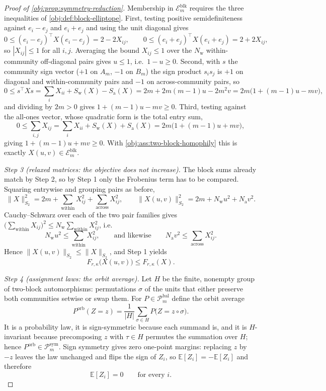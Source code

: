 \documentclass[11pt]{article}
\begin{document}
\begin{proof}[Proof of \cref{obj:prop:symmetry-reduction}]
Membership in \(\mathcal E_m^{\mathrm{blk}}\) requires the three inequalities of \cref{obj:def:block-elliptope}.  First, testing positive semidefiniteness against \(e_i-e_j\) and \(e_i+e_j\) and using the unit diagonal gives
\[
0\le(e_i-e_j)^\top X(e_i-e_j)=2-2X_{ij},
\qquad
0\le(e_i+e_j)^\top X(e_i+e_j)=2+2X_{ij},
\]
so \(|X_{ij}|\le1\) for all \(i,j\). %
Averaging the bound \(X_{ij}\le1\) over the \(N_{\mathrm{w}}\) within-community off-diagonal pairs gives \(u\le1\), i.e.\ \(1-u\ge0\).  Second, with \(s\) the community sign vector (\(+1\) on \(A_m\), \(-1\) on \(B_m\)) the sign product \(s_is_j\) is \(+1\) on diagonal and within-community pairs and \(-1\) on across-community pairs, so
\[
0\le s^\top Xs=\sum_iX_{ii}+S_{\mathrm{w}}(X)-S_{\mathrm{a}}(X)
=2m+2m(m-1)u-2m^2v
=2m\bigl(1+(m-1)u-mv\bigr),
\]
and dividing by \(2m>0\) gives \(1+(m-1)u-mv\ge0\).  Third, testing against the all-ones vector, whose quadratic form is the total entry sum,
\[
0\le\sum_{i,j}X_{ij}=\sum_iX_{ii}+S_{\mathrm{w}}(X)+S_{\mathrm{a}}(X)
=2m\bigl(1+(m-1)u+mv\bigr),
\]
giving \(1+(m-1)u+mv\ge0\).  With \cref{obj:ass:two-block-homophily} this is exactly \(X(u,v)\in\mathcal E_m^{\mathrm{blk}}\). %

\emph{Step 3 (relaxed matrices: the objective does not increase).}  The block sums already match by Step 2, so by Step 1 only the Frobenius term has to be compared.  Squaring entrywise and grouping pairs as before,
\[
\|X\|_{S_2}^2=2m+\sum_{\text{within}}X_{ij}^2+\sum_{\text{across}}X_{ij}^2,
\qquad
\|X(u,v)\|_{S_2}^2=2m+N_{\mathrm{w}}u^2+N_{\mathrm{a}}v^2 .
\]
Cauchy--Schwarz over each of the two pair families gives \(\bigl(\sum_{\text{within}}X_{ij}\bigr)^2\le N_{\mathrm{w}}\sum_{\text{within}}X_{ij}^2\), i.e.
\[
N_{\mathrm{w}}u^2\le\sum_{\text{within}}X_{ij}^2,
\qquad\text{and likewise}\qquad
N_{\mathrm{a}}v^2\le\sum_{\text{across}}X_{ij}^2 .
\]
Hence \(\|X(u,v)\|_{S_2}\le\|X\|_{S_2}\), %
and Step 1 yields
\[
F_{r,\kappa}\bigl(X(u,v)\bigr)\le F_{r,\kappa}(X).
\]

\emph{Step 4 (assignment laws: the orbit average).}  Let \(H\) be the finite, nonempty group of two-block automorphisms: permutations \(\sigma\) of the units that either preserve both communities setwise or swap them.  For \(P\in\mathcal P_m^{\mathrm{bal}}\) define the orbit average
\[
P^{\mathrm{orb}}(Z=z)=\frac{1}{|H|}\sum_{\sigma\in H}P\bigl(Z=z\circ\sigma\bigr).
\]
It is a probability law, it is sign-symmetric because each summand is, and it is \(H\)-invariant because precomposing \(z\) with \(\tau\in H\) permutes the summation over \(H\); hence \(P^{\mathrm{orb}}\in\mathcal P_m^{\mathrm{sym}}\). %
Sign symmetry gives zero one-point margins: replacing \(z\) by \(-z\) leaves the law unchanged and flips the sign of \(Z_i\), so \(\mathbb E[Z_i]=-\mathbb E[Z_i]\) and therefore
\[
\mathbb E[Z_i]=0
\qquad\text{for every }i .
\]


\end{proof}
\end{document}
